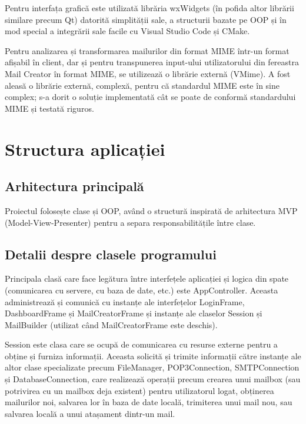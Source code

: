 \documentclass[runningheads]{llncs}
\begin{document}
Pentru interfața grafică este utilizată librăria wxWidgets (în pofida altor librării similare precum Qt) datorită simplității sale, a structurii bazate pe OOP și în mod special a integrării sale facile cu Visual Studio Code și CMake.

Pentru analizarea și transformarea mailurilor din format MIME\cite{ref_rfc_mime} într-un format afișabil în client, dar și pentru transpunerea input-ului utilizatorului din fereastra Mail Creator în format MIME, se utilizează o librărie externă (VMime). A fost aleasă o librărie externă, complexă, pentru că standardul MIME este în sine complex; s-a dorit o soluție implementată cât se poate de conformă standardului MIME și testată riguros.



\section{Structura aplicației}


\subsection{Arhitectura principală}

Proiectul folosește clase și OOP, având o structură inspirată de arhitectura MVP (Model-View-Presenter) pentru a separa responsabilitățile între clase.



\subsection{Detalii despre clasele programului}


Principala clasă care face legătura între interfețele aplicației și logica din spate (comunicarea cu servere, cu baza de date, etc.) este AppController. Aceasta administrează și comunică cu instanțe ale interfețelor LoginFrame, DashboardFrame și MailCreatorFrame și instanțe ale claselor Session și MailBuilder (utilizat când MailCreatorFrame este deschis).

Session este clasa care se ocupă de comunicarea cu resurse externe pentru a obține și furniza informații. Aceasta solicită și trimite informații către instanțe ale altor clase specializate precum FileManager, POP3Connection, SMTPConnection și DatabaseConnection, care realizează operații precum crearea unui mailbox (sau potrivirea cu un mailbox deja existent) pentru utilizatorul logat, obținerea mailurilor noi, salvarea lor în baza de date locală, trimiterea unui mail nou, sau salvarea locală a unui atașament dintr-un mail.
\end{document}

